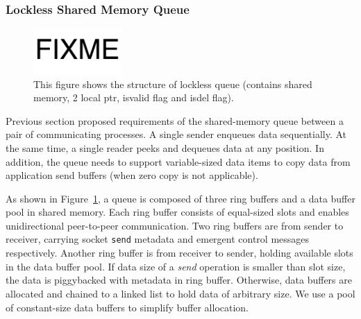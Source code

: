 


\subsubsection{Lockless Shared Memory Queue}
\label{subsec:lockless-queue}

\begin{figure}[t]
	\centering
	\includegraphics[width=0.3\textwidth]{images/fixme}
	\caption{This figure shows the structure of lockless queue (contains shared memory, 2 local ptr, isvalid flag and isdel flag).}
	\label{fig:locklessq-structure}
\end{figure}

Previous section proposed requirements of the shared-memory queue between a pair of communicating processes. A single sender enqueues data sequentially. At the same time, a single reader peeks and dequeues data at any position. In addition, the queue needs to support variable-sized data items to copy data from application send buffers (when zero copy is not applicable).

As shown in Figure~\ref{fig:locklessq-structure}, a queue is composed of three ring buffers and a data buffer pool in shared memory. Each ring buffer consists of equal-sized slots and enables unidirectional peer-to-peer communication. Two ring buffers are from sender to receiver, carrying socket \texttt{send} metadata and emergent control messages respectively. Another ring buffer is from receiver to sender, holding available slots in the data buffer pool. If data size of a \textit{send} operation is smaller than slot size, the data is piggybacked with metadata in ring buffer. Otherwise, data buffers are allocated and chained to a linked list to hold data of arbitrary size. We use a pool of constant-size data buffers to simplify buffer allocation.

